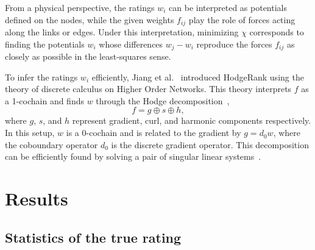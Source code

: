 \documentclass[preprint,12pt]{elsarticle}
\begin{document}
From a physical perspective, the ratings $w_i$ can be interpreted as potentials defined on the nodes, while the given weights $f_{ij}$ play the role of forces acting along the links or edges.
Under this interpretation, minimizing $\chi$ corresponds to finding the potentials $w_i$ whose differences $w_j-w_i$ reproduce the forces $f_{ij}$ as closely as possible in the least-squares sense.

To infer the ratings $w_i$ efficiently, Jiang et al.~\cite{jiang2011statistical} introduced HodgeRank using the theory of discrete calculus on Higher Order Networks.
This theory interprets $f$ as a 1-cochain and finds $w$ through the Hodge decomposition~\cite{grady2010discrete,lim2020hodge,bianconi2021higher},
%
\begin{equation}
f = g \oplus s \oplus h ,
\end{equation}
%
where $g$, $s$, and $h$ represent gradient, curl, and harmonic components respectively.
In this setup, $w$ is a 0-cochain and is related to the gradient by $g=d_0 w$, where the coboundary operator $d_0$ is the discrete gradient operator.
This decomposition can be efficiently found by solving a pair of singular linear systems~\cite{perotti2025analysis}.


\section{Results}
\label{se:res}

\subsection{Statistics of the true rating}
\label{sse:rat}
\end{document}
